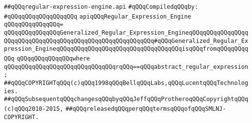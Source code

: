 \label{src/lib/regex/backend/regular-expression-engine.api}
\verb|##qQQqregular-expression-engine.api|\newline
\newline
\verb|#qQQqCompiledqQQqby:|\newline
\verb|#qQQqqQQqqQQqqQQqqQQq|\newline
\newline
\newline
\verb|apiqQQqRegular_Expression_Engine|\newline
\verb|qQQqqQQqqQQqqQQq=|\newline
\verb|qQQqqQQqqQQqqQQqGeneralized_Regular_Expression_EngineqQQqqQQqqQQqqQQqqQQqqQQqqQQqqQQqqQQqqQQqqQQqqQQqqQQqqQQqqQQq#qQQqGeneralized_Regular_Expression_EngineqQQqqQQqqQQqqQQqqQQqqQQqqQQqqQQqqQQqisqQQqfromqQQqqQQqqQQq|\newline
\verb|qQQqqQQqqQQqqQQqwhere|\newline
\verb|qQQqqQQqqQQqqQQqqQQqqQQqqQQqqQQqrqQQq==qQQqabstract_regular_expression;|\newline
\newline
\newline
\verb|##qQQqCOPYRIGHTqQQq(c)qQQq1998qQQqBellqQQqLabs,qQQqLucentqQQqTechnologies.|\newline
\verb|##qQQqSubsequentqQQqchangesqQQqbyqQQqJeffqQQqProtheroqQQqCopyrightqQQq(c)qQQq2010-2015,|\newline
\verb|##qQQqreleasedqQQqperqQQqtermsqQQqofqQQqSMLNJ-COPYRIGHT.|\newline

